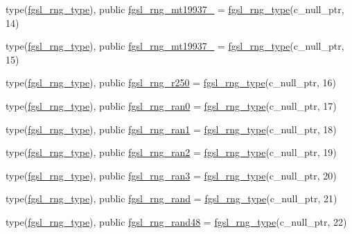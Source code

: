 \begin{DoxyCompactItemize}
\item 
type(\hyperlink{structfgsl_1_1fgsl__rng__type}{fgsl\-\_\-rng\-\_\-type}), public \hyperlink{classfgsl_a9e349dde1852d8ef9eb4bbdcc9de661a}{fgsl\-\_\-rng\-\_\-mt19937\-\_} = \hyperlink{structfgsl_1_1fgsl__rng__type}{fgsl\-\_\-rng\-\_\-type}(c\-\_\-null\-\_\-ptr, 14)
\item 
type(\hyperlink{structfgsl_1_1fgsl__rng__type}{fgsl\-\_\-rng\-\_\-type}), public \hyperlink{classfgsl_a984a8a295a9ec6b581b70421f780df53}{fgsl\-\_\-rng\-\_\-mt19937\-\_} = \hyperlink{structfgsl_1_1fgsl__rng__type}{fgsl\-\_\-rng\-\_\-type}(c\-\_\-null\-\_\-ptr, 15)
\item 
type(\hyperlink{structfgsl_1_1fgsl__rng__type}{fgsl\-\_\-rng\-\_\-type}), public \hyperlink{classfgsl_ada1200ead9fd55af5e211bdd3666dea1}{fgsl\-\_\-rng\-\_\-r250} = \hyperlink{structfgsl_1_1fgsl__rng__type}{fgsl\-\_\-rng\-\_\-type}(c\-\_\-null\-\_\-ptr, 16)
\item 
type(\hyperlink{structfgsl_1_1fgsl__rng__type}{fgsl\-\_\-rng\-\_\-type}), public \hyperlink{classfgsl_a355fcde51e3f3a5d6ad8ea548e7cdb0c}{fgsl\-\_\-rng\-\_\-ran0} = \hyperlink{structfgsl_1_1fgsl__rng__type}{fgsl\-\_\-rng\-\_\-type}(c\-\_\-null\-\_\-ptr, 17)
\item 
type(\hyperlink{structfgsl_1_1fgsl__rng__type}{fgsl\-\_\-rng\-\_\-type}), public \hyperlink{classfgsl_a4b91ddd8f42db11c9ae467f1b8fbe5f2}{fgsl\-\_\-rng\-\_\-ran1} = \hyperlink{structfgsl_1_1fgsl__rng__type}{fgsl\-\_\-rng\-\_\-type}(c\-\_\-null\-\_\-ptr, 18)
\item 
type(\hyperlink{structfgsl_1_1fgsl__rng__type}{fgsl\-\_\-rng\-\_\-type}), public \hyperlink{classfgsl_a82dd93da12a619eb5cbf8a4d32e44daa}{fgsl\-\_\-rng\-\_\-ran2} = \hyperlink{structfgsl_1_1fgsl__rng__type}{fgsl\-\_\-rng\-\_\-type}(c\-\_\-null\-\_\-ptr, 19)
\item 
type(\hyperlink{structfgsl_1_1fgsl__rng__type}{fgsl\-\_\-rng\-\_\-type}), public \hyperlink{classfgsl_a2bcafc9c66a493e0ad7ead60bf9d9a0e}{fgsl\-\_\-rng\-\_\-ran3} = \hyperlink{structfgsl_1_1fgsl__rng__type}{fgsl\-\_\-rng\-\_\-type}(c\-\_\-null\-\_\-ptr, 20)
\item 
type(\hyperlink{structfgsl_1_1fgsl__rng__type}{fgsl\-\_\-rng\-\_\-type}), public \hyperlink{classfgsl_afbedce588830713e9a4f2dfdebe1a262}{fgsl\-\_\-rng\-\_\-rand} = \hyperlink{structfgsl_1_1fgsl__rng__type}{fgsl\-\_\-rng\-\_\-type}(c\-\_\-null\-\_\-ptr, 21)
\item 
type(\hyperlink{structfgsl_1_1fgsl__rng__type}{fgsl\-\_\-rng\-\_\-type}), public \hyperlink{classfgsl_ae82ea40ab1281a4f6390dc0fd2ba998b}{fgsl\-\_\-rng\-\_\-rand48} = \hyperlink{structfgsl_1_1fgsl__rng__type}{fgsl\-\_\-rng\-\_\-type}(c\-\_\-null\-\_\-ptr, 22)

\end{DoxyCompactItemize}
